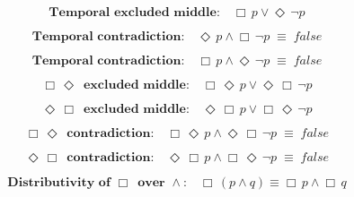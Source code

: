 \documentclass[12pt, fleqn, leqno]{article}
\newcommand{\equivs}{\ensuremath{\;\equiv\;}}       %
\newcommand{\Event}{\Diamond\,}
\newcommand{\Always}{\Box\,}
\newcommand{\spacer}{\vspace{-30pt}}
\begin{document}
\spacer

\begin{equation}\label{E:excludedMidb}
\textbf{Temporal excluded middle:}\quad \Always p \lor \Event\neg p
\end{equation}

\spacer

\begin{equation}\label{E:contradiction}
\textbf{Temporal contradiction:}\quad \Event p \land \Always\neg p \equivs false
\end{equation}

\spacer

\begin{equation}\label{E:contradictionb}
\textbf{Temporal contradiction:}\quad \Always p \land \Event\neg p \equivs false
\end{equation}

\spacer

\begin{equation}\label{E:AEexcludedMid}
\textbf{$\Always \Event $ excluded middle:}\quad \Always \Event p \lor \Event \Always\neg p
\end{equation}

\spacer

\begin{equation}\label{E:EAexcludedMid}
\textbf{$\Event \Always $ excluded middle:}\quad \Event \Always p \lor \Always \Event\neg p
\end{equation}

\spacer

\begin{equation}\label{E:AEcontradiction}
\textbf{$\Always \Event$ contradiction:}\quad \Always \Event p \land \Event \Always\neg p \equivs false
\end{equation}

\spacer

\begin{equation}\label{E:EAcontradiction}
\textbf{$\Event \Always$ contradiction:}\quad \Event \Always p \land  \Always \Event\neg p \equivs false
\end{equation}

\spacer

\begin{equation}\label{E:distAlwaysAnd}
\textbf{Distributivity of $\Always$ over $\land$:}\quad \Always (p \land q) \equiv \Always p \land \Always q
\end{equation}
\end{document}
